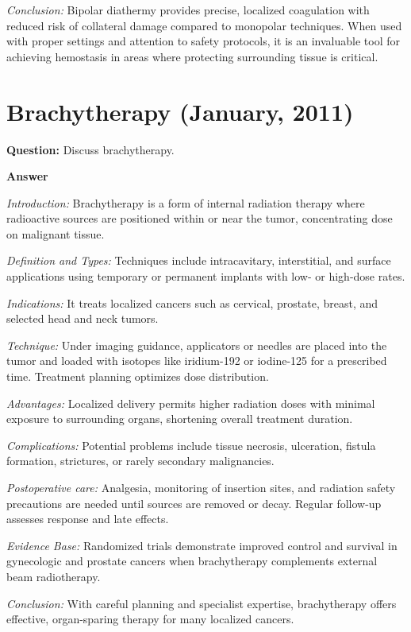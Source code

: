 \documentclass{article}
\begin{document}
\emph{Conclusion:} Bipolar diathermy provides precise, localized coagulation with reduced risk of collateral damage compared to monopolar techniques. When used with proper settings and attention to safety protocols, it is an invaluable tool for achieving hemostasis in areas where protecting surrounding tissue is critical.

\section{Brachytherapy (January, 2011)}

\textbf{Question:} Discuss brachytherapy.

\textbf{Answer}

\emph{Introduction:} Brachytherapy is a form of internal radiation therapy where radioactive sources are positioned within or near the tumor, concentrating dose on malignant tissue.

\emph{Definition and Types:} Techniques include intracavitary, interstitial, and surface applications using temporary or permanent implants with low- or high-dose rates.

\emph{Indications:} It treats localized cancers such as cervical, prostate, breast, and selected head and neck tumors.

\emph{Technique:} Under imaging guidance, applicators or needles are placed into the tumor and loaded with isotopes like iridium-192 or iodine-125 for a prescribed time. Treatment planning optimizes dose distribution.

\emph{Advantages:} Localized delivery permits higher radiation doses with minimal exposure to surrounding organs, shortening overall treatment duration.

\emph{Complications:} Potential problems include tissue necrosis, ulceration, fistula formation, strictures, or rarely secondary malignancies.

\emph{Postoperative care:} Analgesia, monitoring of insertion sites, and radiation safety precautions are needed until sources are removed or decay. Regular follow-up assesses response and late effects.

\emph{Evidence Base:} Randomized trials demonstrate improved control and survival in gynecologic and prostate cancers when brachytherapy complements external beam radiotherapy.

\emph{Conclusion:} With careful planning and specialist expertise, brachytherapy offers effective, organ-sparing therapy for many localized cancers.
\end{document}
